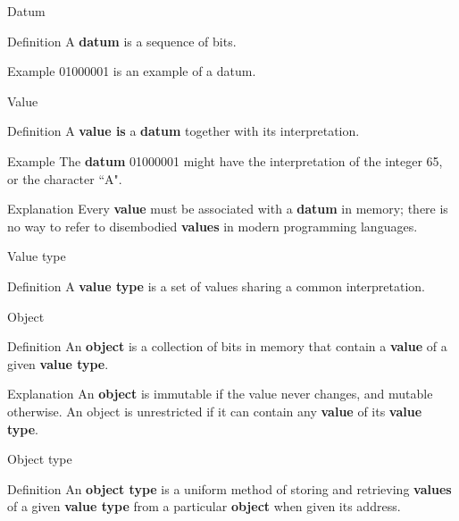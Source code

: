 \documentclass[10pt]{beamer}
\begin{document}
\begin{frame}[fragile]{Datum}
\begin{block}{Definition}
A \textbf{datum} is a sequence of bits.
\end{block}

\begin{block}{Example}
01000001 is an example of a datum.
\end{block}

\end{frame}

\begin{frame}[fragile]{Value}
\begin{block}{Definition}
A \textbf{value is} a \textbf{datum} together with its interpretation.
\end{block}
\begin{block}{Example}
The \textbf{datum} 01000001 might have the interpretation of the integer 65, or the character “A".
\end{block}
\begin{block}{Explanation}
Every \textbf{value} must be associated with a \textbf{datum} in memory; there is no way to refer to disembodied \textbf{values} in modern programming languages.
\end{block}
\end{frame}

\begin{frame}[fragile]{Value type}
\begin{block}{Definition}
A \textbf{value type} is a set of values sharing a common interpretation.
\end{block}
\end{frame}

\begin{frame}[fragile]{Object}
\begin{block}{Definition}
An \textbf{object} is a collection of bits in memory that contain a \textbf{value} of a given \textbf{value type}.
\end{block}
\begin{block}{Explanation}
An \textbf{object} is immutable if the value never changes, and mutable otherwise. An object is unrestricted if it can contain any \textbf{value} of its \textbf{value type}.
\end{block}
\end{frame}


\begin{frame}[fragile]{Object type}
\begin{block}{Definition}
An \textbf{object type} is a uniform method of storing and retrieving \textbf{values} of a given \textbf{value type} from a particular \textbf{object} when given its address.
\end{block}
\end{frame}
\end{document}
